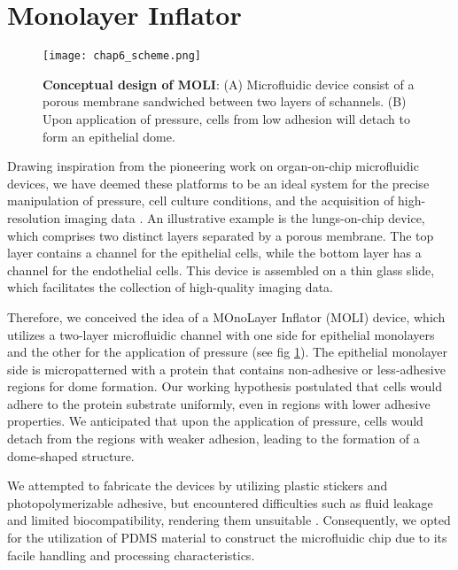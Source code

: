 \hypertarget{monolayer-inflator}{%
\section{Monolayer Inflator}\label{monolayer-inflator}}

\begin{figure}[b!]
	\centering
	\texttt{[image: chap6\_scheme.png]}
	\caption{\textbf{Conceptual design of MOLI}: (A) Microfluidic device consist of a porous membrane sandwiched between two layers of schannels. (B) Upon application of pressure, cells from low adhesion will detach to form an epithelial dome. 
	}\label{fig_6_1}
\end{figure}

Drawing inspiration from the pioneering work on organ-on-chip microfluidic devices, we have deemed these platforms to be an ideal system for the precise manipulation of pressure, cell culture conditions, and the acquisition of high-resolution imaging data \cite{huh2010, nelson2017}. An illustrative example is the lungs-on-chip device, which comprises two distinct layers separated by a porous membrane. The top layer contains a channel for the epithelial cells, while the bottom layer has a channel for the endothelial cells. This device is assembled on a thin glass slide, which facilitates the collection of high-quality imaging data. 

Therefore, we conceived the idea of a MOnoLayer Inflator (MOLI) device, which utilizes a two-layer microfluidic channel with one side for epithelial monolayers and the other for the application of pressure (see fig \ref{fig_6_1}). The epithelial monolayer side is micropatterned with a protein that contains non-adhesive or less-adhesive regions for dome formation. Our working hypothesis postulated that cells would adhere to the protein substrate uniformly, even in regions with lower adhesive properties. We anticipated that upon the application of pressure, cells would detach from the regions with weaker adhesion, leading to the formation of a dome-shaped structure.

We attempted to fabricate the devices by utilizing plastic stickers and photopolymerizable adhesive, but encountered difficulties such as fluid leakage and limited biocompatibility, rendering them unsuitable \cite{sollier2011, bartolo2008}. Consequently, we opted for the utilization of PDMS material to construct the microfluidic chip due to its facile handling and processing characteristics.


